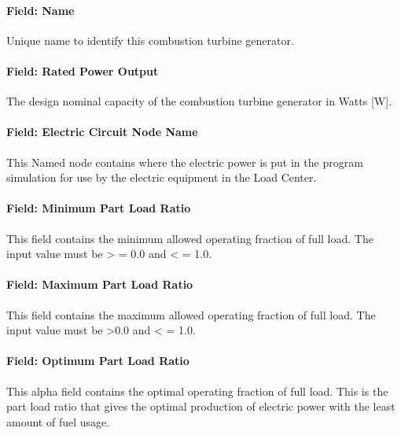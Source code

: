 \paragraph{Field: Name}\label{field-name-9-004}

Unique name to identify this combustion turbine generator.

\paragraph{Field: Rated Power Output}\label{field-rated-power-output-1}

The design nominal capacity of the combustion turbine generator in Watts {[}W{]}.

\paragraph{Field: Electric Circuit Node Name}\label{field-electric-circuit-node-name-1}

This Named node contains where the electric power is put in the program simulation for use by the electric equipment in the Load Center.

\paragraph{Field: Minimum Part Load Ratio}\label{field-minimum-part-load-ratio-1}

This field contains the minimum allowed operating fraction of full load. The input value must be \textgreater{} = 0.0 and \textless{} = 1.0.

\paragraph{Field: Maximum Part Load Ratio}\label{field-maximum-part-load-ratio-1}

This field contains the maximum allowed operating fraction of full load. The input value must be \textgreater{}0.0 and \textless{} = 1.0.

\paragraph{Field: Optimum Part Load Ratio}\label{field-optimum-part-load-ratio-1}

This alpha field contains the optimal operating fraction of full load. This is the part load ratio that gives the optimal production of electric power with the least amount of fuel usage.


